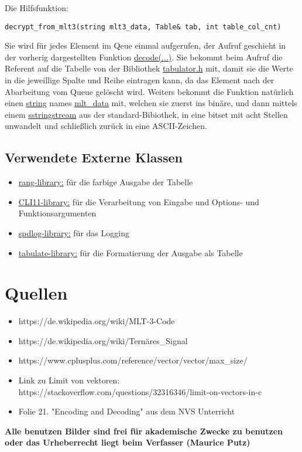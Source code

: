\documentclass{article}
\begin{document}
Die Hilfsfunktion:
\begin{lstlisting}
decrypt_from_mlt3(string mlt3_data, Table& tab, int table_col_cnt)
\end{lstlisting}

Sie wird für jedes Element im Qeue einmal aufgerufen, der Aufruf geschieht in der vorherig dargestellten Funktion \underline{decode(...)}. Sie bekommt beim Aufruf die Referent auf die
Tabelle von der Bibliothek \underline{tabulator.h} mit, damit sie die Werte in die jeweillige Spalte und Reihe eintragen kann, da das Element nach der Abarbeitung vom Queue gelöscht wird.
Weiters bekommt die Funktion natürlich einen \underline{string} names \underline{mlt\_data} mit, welchen sie zuerst ins binäre, und dann mittels einem \underline{sstringstream} aus 
der standard-Bibiothek, in eine bitset mit acht Stellen unwandelt und schließlich zurück in eine ASCII-Zeichen.


\subsection{Verwendete Externe Klassen}
\begin{itemize}
	\item \underline{rang-library:} für die farbige Ausgabe der Tabelle
	\item \underline{CLI11-library:} für die Verarbeitung von Eingabe und Options- und Funktionsargumenten
	\item \underline{spdlog-library:} für das Logging
	\item \underline{tabulate-library:} für die Formatierung der Ausgabe als Tabelle
\end{itemize}


\section{Quellen}

\begin{itemize}
	\item https://de.wikipedia.org/wiki/MLT-3-Code
	\item https://de.wikipedia.org/wiki/Ternäres\_Signal
	\item https://www.cplusplus.com/reference/vector/vector/max\_size/
	\item Link zu Limit von vektoren: https://stackoverflow.com/questions/32316346/limit-on-vectors-in-c
	\item Folie 21. "Encoding and Decoding" aus dem NVS Unterricht
\end{itemize}

\textbf{Alle benutzen Bilder sind frei für akademische Zwecke zu benutzen oder das Urheberrecht liegt beim Verfasser (Maurice Putz)}
\end{document}
